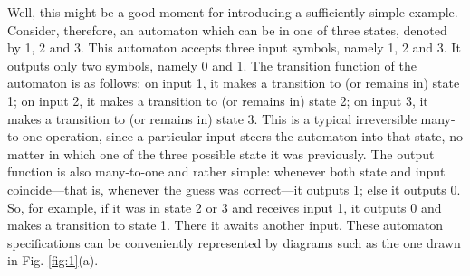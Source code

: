 Well, this might be a good moment for introducing a sufficiently
simple example.
Consider, therefore, an automaton which can be in one of three
states, denoted by 1, 2 and 3.
This automaton accepts three input symbols, namely 1, 2 and 3.
It outputs only two symbols, namely 0 and 1.
The transition function of the automaton is as follows:
on input 1, it makes a transition to (or remains in) state 1;
on input 2, it makes a transition to (or remains in) state 2;
on input 3, it makes a transition to (or remains in) state 3.
This is a typical irreversible many-to-one operation, since a particular
input steers the automaton into that state, no matter in which one of
the three possible state it was previously.
The output function is also many-to-one and rather simple: whenever both
state and input
coincide---that is, whenever the guess was correct---it outputs 1; else
it outputs 0. So, for example, if it was in state 2 or 3 and receives
input
1, it outputs 0 and makes a transition to state 1. There it awaits
another input. These automaton specifications can be conveniently
represented by diagrams such as the one drawn in Fig.
\ref{fig:1}(a).
